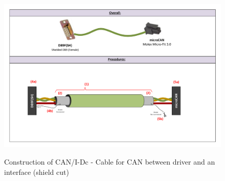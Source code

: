 \begin{figure}
  \centering
  \includegraphics[angle=90,width=1\columnwidth]{figs/body03/FIGCANIDcconstruction.pdf}\\
  \caption[Construction of CAN/I-Dc - Cable for CAN between driver and an interface (shield cut)]{Construction of CAN/I-Dc - Cable for CAN between driver and an interface (shield cut)}
  \label{FIG:CANIDcconstruction}
\end{figure}

